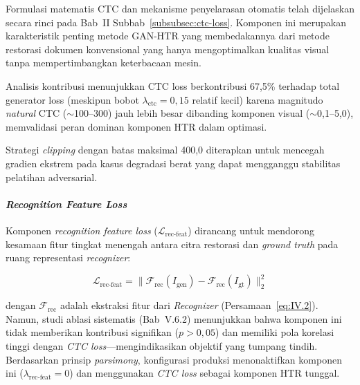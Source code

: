 Formulasi matematis CTC dan mekanisme penyelarasan otomatis telah dijelaskan secara rinci pada Bab~II Subbab~\ref{subsubsec:ctc-loss}. Komponen ini merupakan karakteristik penting metode GAN-HTR yang membedakannya dari metode restorasi dokumen konvensional yang hanya mengoptimalkan kualitas visual tanpa mempertimbangkan keterbacaan mesin.

Analisis kontribusi menunjukkan CTC loss berkontribusi 67,5\% terhadap total generator loss (meskipun bobot $\lambda_{\text{ctc}}=0,15$ relatif kecil) karena magnitudo \textit{natural} CTC ($\sim$100--300) jauh lebih besar dibanding komponen visual ($\sim$0,1--5,0), memvalidasi peran dominan komponen HTR dalam optimasi.

Strategi \textit{clipping} dengan batas maksimal 400,0 diterapkan untuk mencegah gradien ekstrem pada kasus degradasi berat yang dapat mengganggu stabilitas pelatihan adversarial.

\paragraph{\textit{Recognition Feature Loss}}

Komponen \textit{recognition feature loss} ($\mathcal{L}_{\text{rec-feat}}$) dirancang untuk mendorong kesamaan fitur tingkat menengah antara citra restorasi dan \textit{ground truth} pada ruang representasi \textit{recognizer}:

\begin{equation}
  \mathcal{L}_{\text{rec-feat}} = \|\mathcal{F}_{\text{rec}}(I_{\text{gen}}) - \mathcal{F}_{\text{rec}}(I_{\text{gt}})\|_2^2
  \label{eq:IV.3}
\end{equation}

\noindent dengan $\mathcal{F}_{\text{rec}}$ adalah ekstraksi fitur dari \textit{Recognizer} (Persamaan~\ref{eq:IV.2}). Namun, studi ablasi sistematis (Bab~V.6.2) menunjukkan bahwa komponen ini tidak memberikan kontribusi signifikan ($p>0,05$) dan memiliki pola korelasi tinggi dengan \textit{CTC loss}---mengindikasikan objektif yang tumpang tindih. Berdasarkan prinsip \textit{parsimony}, konfigurasi produksi menonaktifkan komponen ini ($\lambda_{\text{rec-feat}}=0$) dan menggunakan \textit{CTC loss} sebagai komponen HTR tunggal.


